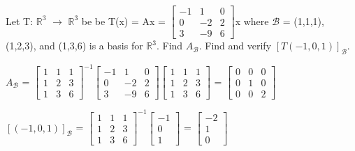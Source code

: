     \newpage



    \begin{example}
        Let T: $\mathbb{R}^3$ $\rightarrow$ $\mathbb{R}^3$
        be be T(x) = Ax =
        $\begin{bmatrix}
            -1 & 1 & 0 \\
            0 & -2 & 2 \\
            3 & -9 & 6
        \end{bmatrix}$x
        where $\mathcal{B}$ = (1,1,1), (1,2,3), and (1,3,6)
        is a basis for $\mathbb{R}^3$.
        Find $A_{\mathcal{B}}$.
        Find and verify $[T(-1,0,1)]_{\mathcal{B}}$.
    \end{example}

    \begin{tbox}
        $A_{\mathcal{B}}$ =
        $\begin{bmatrix}
            1 & 1 & 1 \\
            1 & 2 & 3 \\
            1 & 3 & 6
        \end{bmatrix}^{-1}
        \begin{bmatrix}
            -1 & 1 & 0 \\
            0 & -2 & 2 \\
            3 & -9 & 6
        \end{bmatrix}
        \begin{bmatrix}
            1 & 1 & 1 \\
            1 & 2 & 3 \\
            1 & 3 & 6
        \end{bmatrix}$ =
        $\begin{bmatrix}
            0 & 0 & 0 \\
            0 & 1 & 0 \\
            0 & 0 & 2
        \end{bmatrix}$

        $[(-1,0,1)]_{\mathcal{B}}$
        = $\begin{bmatrix}
            1 & 1 & 1 \\
            1 & 2 & 3 \\
            1 & 3 & 6
        \end{bmatrix}^{-1}
        \begin{bmatrix}
            -1 \\
            0 \\
            1
        \end{bmatrix}$ =
        $\begin{bmatrix}
            -2 \\
            1 \\
            0
        \end{bmatrix}$


\end{tbox}
